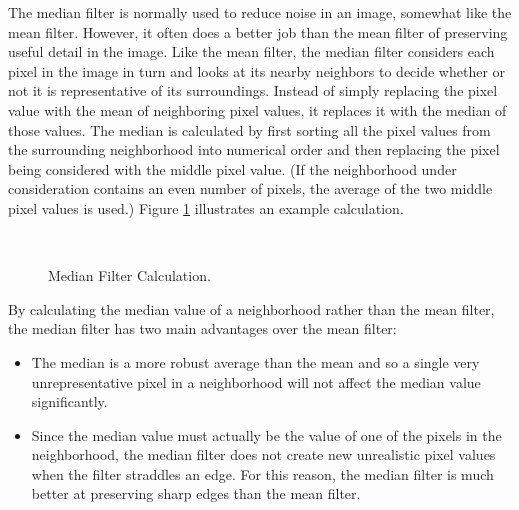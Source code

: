 The median filter is normally used to 
reduce noise in an image, somewhat 
like the mean filter. However, it often 
does a better job than the mean filter 
of preserving useful detail in the 
image. Like the mean filter, the 
median filter considers each pixel in 
the image in turn and looks at its 
nearby neighbors to decide whether or 
not it is representative of its 
surroundings. Instead of simply replacing the pixel value with the mean of neighboring pixel 
values, it replaces it with the median of those values. The median is calculated by first sorting 
all the pixel values from the surrounding neighborhood into numerical order and then replacing 
the pixel being considered with the middle pixel value. (If the neighborhood under consideration 
contains an even number of pixels, the average of the two middle pixel values is used.) Figure \ref{fig:fig7}
illustrates an example calculation.

\begin{figure}[h]
\begin{dBox}
\centering
\mbox{
   }
   \caption{ Median Filter Calculation.
   \label{fig:fig7} }   
\end{dBox}   
\end{figure}
\bigskip

By calculating the median value of a neighborhood rather than the mean filter, the median filter 
has two main advantages over the mean filter: 
\begin{itemize}
\item The median is a more robust average than the mean and so a single very 
unrepresentative pixel in a neighborhood will not affect the median value significantly. 
\item Since the median value must actually be the value of one of the pixels in the 
neighborhood, the median filter does not create new unrealistic pixel values when the 
filter straddles an edge. For this reason, the median filter is much better at preserving 
sharp edges than the mean filter.
\end{itemize}

